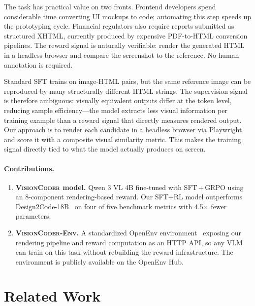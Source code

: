 \documentclass[10pt,twocolumn,letterpaper]{article}
\newcommand{\model}[1]{\textsc{#1}}
\begin{document}
The task has practical value on two fronts.  Frontend developers spend
considerable time converting UI mockups to code; automating this step speeds
up the prototyping cycle.  Financial regulators also require reports submitted
as structured XHTML, currently produced by expensive PDF-to-HTML conversion
pipelines.  The reward signal is naturally verifiable: render the generated
HTML in a headless browser and compare the screenshot to the reference.
No human annotation is required.

Standard SFT trains on image-HTML pairs, but the same reference image can be
reproduced by many structurally different HTML strings.  The supervision signal
is therefore ambiguous: visually equivalent outputs differ at the token level,
reducing sample efficiency---the model extracts less visual information per
training example than a reward signal that directly measures rendered output.
Our approach is to render each candidate in a headless browser via
Playwright~\citep{playwright2023} and score it with a composite visual
similarity metric.  This makes the training signal directly tied to what the
model actually produces on screen.

\paragraph{Contributions.}
\begin{enumerate}[leftmargin=1em,itemsep=1pt,topsep=2pt]
\item \textbf{\model{VisionCoder} model.}  Qwen 3 VL 4B fine-tuned with
      SFT\,+\,GRPO using an 8-component rendering-based reward.  Our SFT+RL
      model outperforms Design2Code-18B~\citep{si2025design2code} on four of
      five benchmark metrics with 4.5$\times$ fewer parameters.
\item \textbf{\model{VisionCoder-Env}.}  A standardized OpenEnv
      environment~\citep{openenv2025} exposing our rendering pipeline and
      reward computation as an HTTP API, so any VLM can train on this task
      without rebuilding the reward infrastructure.  The environment is
      publicly available on the OpenEnv Hub.
\end{enumerate}

\section{Related Work}
\end{document}
